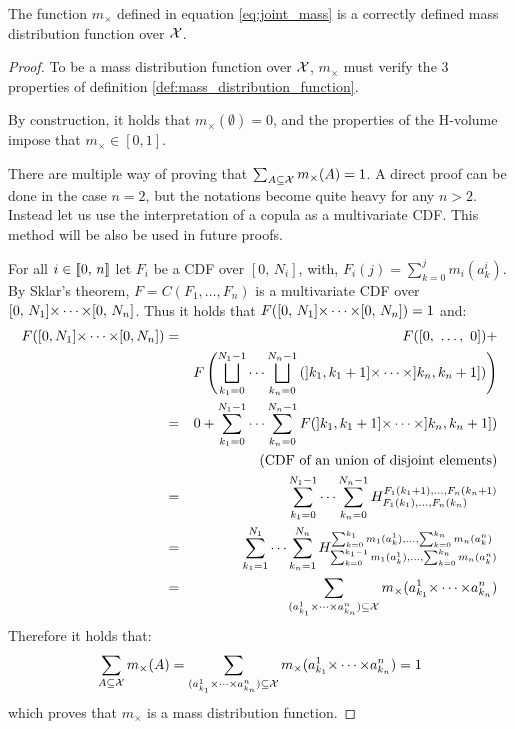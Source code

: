 \begin{proposition}
    The function $m_\times$ defined in equation \eqref{eq:joint_mass} is a correctly defined mass distribution function over ${\mathcal{X}}$. 
\end{proposition}
\begin{proof}
    To be a mass distribution function over ${\mathcal{X}}$, $m_\times$ must verify the 3 properties of definition \ref{def:mass_distribution_function}.
    
    By construction, it holds that $m_\times(\emptyset)=0$, and the properties of the H-volume impose that $m_\times\in[0,1]$.
    
    There are multiple way of proving that $\sum_{A\subseteq{\mathcal{X}}}m_\times(A)=1$. A direct proof can be done in the case $n=2$, but the notations become quite heavy for any $n>2$. Instead let us use the interpretation of a copula as a multivariate CDF. This method will be also be used in future proofs.
    
    For all \(i\in{[\![} 0,\, n{]\!]}\) let $F_i$ be a CDF over $[0,\, N_i]$, with, $F_i(j)=\sum_{k=0}^j m_i(a_k^i)$. By Sklar's theorem, $F=C(F_1,\dots, F_n)$ is a multivariate CDF over $[0,\, N_1]{\times\dots\times}[0,\, N_n]$. Thus it holds that $F([0,\, N_1]{\times\dots\times}[0,\, N_n])=1$ and:
    \begin{eqnarray*}
        F([0, N_1]{\times\dots\times}[0, N_n]) &=& F([0, ~\dots, ~0])+\\
        &&F\left(\bigsqcup_{k_1=0}^{N_1-1}\dots\bigsqcup_{k_n=0}^{N_n-1}\left(]k_1, k_1+1]{\times\dots\times}]k_n, k_n+1]\right)\right)\\
        &=& 0 + \sum_{k_1=0}^{N_1-1}\dots\sum_{k_n=0}^{N_n-1} F(]k_1, k_1+1]{\times\dots\times}]k_n, k_n+1])\\
        && \text{(CDF of an union of disjoint elements)}\\
        &=& \sum_{k_1=0}^{N_1-1}\dots\sum_{k_n=0}^{N_n-1} H_{F_1(k_1), \dots, F_n(k_n)}^{F_1(k_1+1), \dots, F_n(k_n+1)}\\
        &=& \sum_{k_1=1}^{N_1}\dots\sum_{k_n=1}^{N_n} H_{\sum_{k=0}^{k_1-1}m_1(a^1_k), \dots, \sum_{k=0}^{k_n}m_n(a^n_k)}^{\sum_{k=0}^{k_1}m_1(a^1_k), \dots, \sum_{k=0}^{k_n}m_n(a^n_k)}\\
        &=& \sum_{(a^1_{k_1}{\times\dots\times} a^n_{k_n})\subseteq{\mathcal{X}}}m_\times(a^1_{k_1}{\times\dots\times} a^n_{k_n})
    \end{eqnarray*}
Therefore it holds that:
\begin{eqnarray}
    \sum_{A\subseteq{\mathcal{X}}}m_\times(A)=\sum_{(a^1_{k_1}{\times\dots\times} a^n_{k_n})\subseteq{\mathcal{X}}}m_\times(a^1_{k_1}{\times\dots\times} a^n_{k_n})=1
\end{eqnarray}
which proves that $m_\times$ is a mass distribution function.
\end{proof}

